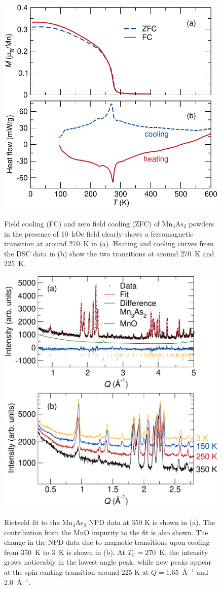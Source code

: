 \documentclass[10pt,doublespacing,edeposit]{uiucthesis2020}
\begin{document}
\begin{mainmatter}
\begin{figure}
\centering\includegraphics[width=0.75\columnwidth]{figures/ch6/FC_ZFC_DSC_Mn3As2_cropped.pdf} \\
\caption{Field cooling (FC) and zero field cooling (ZFC) of Mn$_3$As$_2$ powders in the presence of 10~kOe field clearly shows a ferromagnetic transition at around 270~K in (a). Heating and cooling curves from the DSC data in (b) show the two transitions at around 270~K and 225~K.
}
\label{fig:DSC_SQUID_measurement}
\end{figure}

\begin{figure}
\centering\includegraphics[width=0.75\columnwidth]{figures/ch6/350K_rietveld_diff_temp_NPD_cropped.pdf} \\
\caption{Rietveld fit to the Mn$_3$As$_2$ NPD data at 350 K is shown in (a). The contribution from the MnO impurity to the fit is also shown. The change in the NPD data due to magnetic transitions upon cooling from 350~K to 3~K is shown in (b). At $T_C = 270$~K, the intensity grows noticeably in the lowest-angle peak, while new peaks appear at the spin-canting transition around 225 K at $Q = 1.65$~\AA$^{-1}$ and 2.0~\AA$^{-1}$.
}
\label{fig:350K_data}
\end{figure}



\end{mainmatter}
\end{document}
